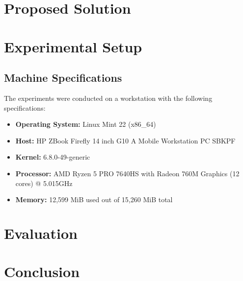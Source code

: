 \documentclass[cic,tc,english]{iiufrgs}
\begin{document}
\chapter{Proposed Solution}
    \label{proposedsolution}
    


\chapter{Experimental Setup}


\section{Machine Specifications}
The experiments were conducted on a workstation with the following specifications:

\begin{itemize}
    \item \textbf{Operating System:} Linux Mint 22 (x86\_64)
    \item \textbf{Host:} HP ZBook Firefly 14 inch G10 A Mobile Workstation PC SBKPF
    \item \textbf{Kernel:} 6.8.0-49-generic
    \item \textbf{Processor:} AMD Ryzen 5 PRO 7640HS with Radeon 760M Graphics (12 cores) @ 5.015GHz
    \item \textbf{Memory:} 12,599 MiB used out of 15,260 MiB total
\end{itemize}



\chapter{Evaluation}
    \label{evaluation}
    


\chapter{Conclusion}
    
\end{document}
